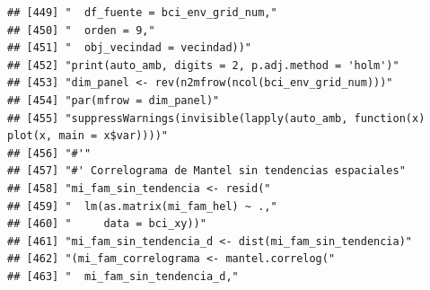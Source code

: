 \documentclass[11pt,]{article}
\begin{document}
\begin{verbatim}
## [449] "  df_fuente = bci_env_grid_num,"                                                                                                                                       
## [450] "  orden = 9,"                                                                                                                                                          
## [451] "  obj_vecindad = vecindad))"                                                                                                                                           
## [452] "print(auto_amb, digits = 2, p.adj.method = 'holm')"                                                                                                                    
## [453] "dim_panel <- rev(n2mfrow(ncol(bci_env_grid_num)))"                                                                                                                     
## [454] "par(mfrow = dim_panel)"                                                                                                                                                
## [455] "suppressWarnings(invisible(lapply(auto_amb, function(x) plot(x, main = x$var))))"                                                                                      
## [456] "#'"                                                                                                                                                                    
## [457] "#' Correlograma de Mantel sin tendencias espaciales"                                                                                                                   
## [458] "mi_fam_sin_tendencia <- resid("                                                                                                                                        
## [459] "  lm(as.matrix(mi_fam_hel) ~ .,"                                                                                                                                       
## [460] "     data = bci_xy))"                                                                                                                                                  
## [461] "mi_fam_sin_tendencia_d <- dist(mi_fam_sin_tendencia)"                                                                                                                  
## [462] "(mi_fam_correlograma <- mantel.correlog("                                                                                                                              
## [463] "  mi_fam_sin_tendencia_d,"                                                                                                                                             

\end{verbatim}
\end{document}

